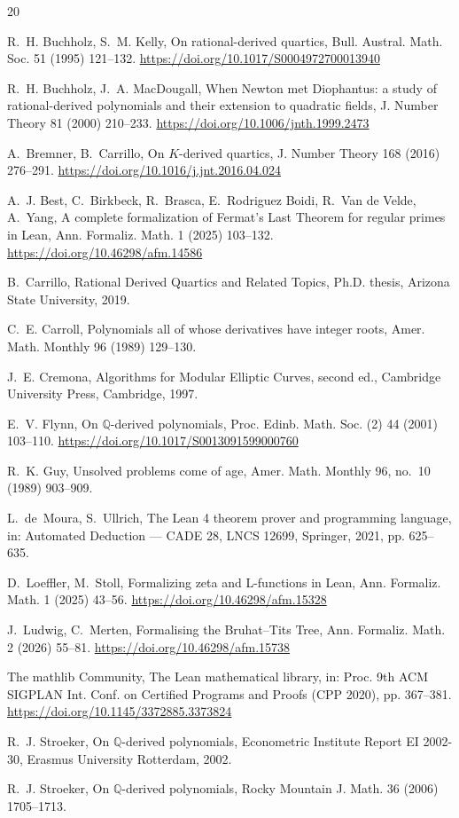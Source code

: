 \documentclass[11pt]{amsart}
\newcommand{\Q}{\mathbb{Q}}
\begin{document}
\begin{thebibliography}{20}

R.~H. Buchholz, S.~M. Kelly,
On rational-derived quartics,
Bull. Austral. Math. Soc. 51 (1995) 121--132.
\url{https://doi.org/10.1017/S0004972700013940}

R.~H. Buchholz, J.~A. MacDougall,
When Newton met Diophantus: a study of rational-derived polynomials and
their extension to quadratic fields,
J. Number Theory 81 (2000) 210--233.
\url{https://doi.org/10.1006/jnth.1999.2473}

A.~Bremner, B.~Carrillo,
On $K$-derived quartics,
J. Number Theory 168 (2016) 276--291.
\url{https://doi.org/10.1016/j.jnt.2016.04.024}

A.~J. Best, C.~Birkbeck, R.~Brasca, E.~Rodriguez Boidi,
R.~Van de Velde, A.~Yang,
A complete formalization of Fermat's Last Theorem for regular primes in
Lean,
Ann. Formaliz. Math. 1 (2025) 103--132.
\url{https://doi.org/10.46298/afm.14586}

B.~Carrillo,
Rational Derived Quartics and Related Topics,
Ph.D. thesis, Arizona State University, 2019.

C.~E. Carroll,
Polynomials all of whose derivatives have integer roots,
Amer. Math. Monthly 96 (1989) 129--130.

J.~E. Cremona,
Algorithms for Modular Elliptic Curves, second ed.,
Cambridge University Press, Cambridge, 1997.

E.~V. Flynn,
On $\Q$-derived polynomials,
Proc. Edinb. Math. Soc. (2) 44 (2001) 103--110.
\url{https://doi.org/10.1017/S0013091599000760}

R.~K. Guy,
Unsolved problems come of age,
Amer. Math. Monthly 96, no.~10 (1989) 903--909.

L.~de~Moura, S.~Ullrich,
The Lean 4 theorem prover and programming language,
in: Automated Deduction --- CADE 28, LNCS 12699, Springer, 2021,
pp. 625--635.

D.~Loeffler, M.~Stoll,
Formalizing zeta and L-functions in Lean,
Ann. Formaliz. Math. 1 (2025) 43--56.
\url{https://doi.org/10.46298/afm.15328}

J.~Ludwig, C.~Merten,
Formalising the Bruhat--Tits Tree,
Ann. Formaliz. Math. 2 (2026) 55--81.
\url{https://doi.org/10.46298/afm.15738}

The mathlib Community,
The Lean mathematical library,
in: Proc. 9th ACM SIGPLAN Int. Conf. on Certified Programs and Proofs
(CPP 2020), pp. 367--381.
\url{https://doi.org/10.1145/3372885.3373824}

R.~J. Stroeker,
On $\Q$-derived polynomials,
Econometric Institute Report EI 2002-30, Erasmus University Rotterdam,
2002.

R.~J. Stroeker,
On $\Q$-derived polynomials,
Rocky Mountain J. Math. 36 (2006) 1705--1713.

\end{thebibliography}
\end{document}
